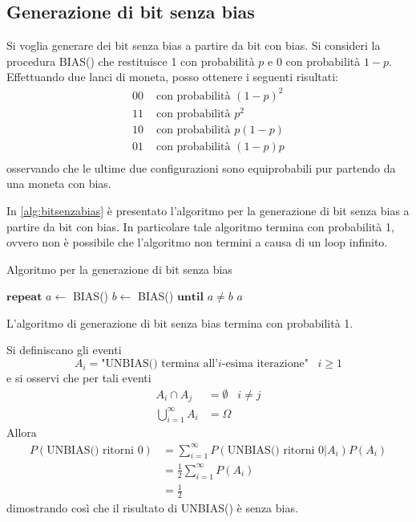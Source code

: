 \subsection{Generazione di bit senza bias}
Si voglia generare dei bit senza bias a partire da bit con bias. Si consideri la procedura BIAS() che restituisce 1 con probabilità $p$ e 0 con probabilità $1-p$. Effettuando due lanci di moneta, posso ottenere i seguenti risultati:
\begin{align*}
00 &\text{ con probabilità } (1-p)^2 \\
11 &\text{ con probabilità } p^2 \\
10 &\text{ con probabilità } p(1-p) \\
01 &\text{ con probabilità } (1-p)p \\
\end{align*}
osservando che le ultime due configurazioni sono equiprobabili pur partendo da una moneta con bias.

In \ref{alg:bitsenzabias} è presentato l'algoritmo per la generazione di bit senza bias a partire da bit con bias. In particolare tale algoritmo termina con probabilità 1, ovvero non è possibile che l'algoritmo non termini a causa di un loop infinito.

\begin{algorithm}
\caption{Algoritmo per la generazione di bit senza bias}
\label{alg:bitsenzabias}
\begin{algorithmic}
	\State $\textbf{repeat}$
		\State $a\gets$ BIAS()
		\State $b\gets$ BIAS()
	\State $\textbf{until } a\neq b$
	\State \Return $a$
\EndFunction
\end{algorithmic}
\end{algorithm}

\begin{proposizione}
L'algoritmo di generazione di bit senza bias termina con probabilità 1.
\end{proposizione}

Si definiscano gli eventi
\[
A_i=\text{"UNBIAS() termina all'}i\text{-esima iterazione"} \,\,\,\,\, i\geq 1
\]
e si osservi che per tali eventi
\begin{align*}
A_i\cap A_j &= \emptyset \,\,\,\,\, i\neq j \\
\bigcup_{i=1}^\infty A_i &= \Omega
\end{align*}
Allora
\begin{align*}
P(\text{UNBIAS() ritorni 0})&=\sum_{i=1}^\infty P(\text{UNBIAS() ritorni 0}|A_i)P(A_i) \\
&=\frac{1}{2}\sum_{i=1}^\infty P(A_i) \\
&=\frac{1}{2}
\end{align*}
dimostrando così che il risultato di UNBIAS() è senza bias.

